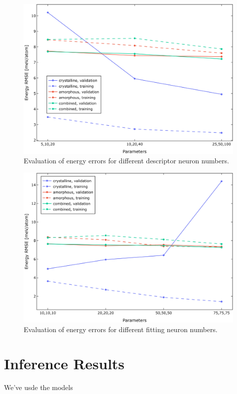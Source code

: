 \begin{figure}
  \begin{center}
    \includegraphics[width=.8\textwidth]{
      asset/descriptor_energy_error_evaluation.jpg
    }
  \end{center}
  \caption{Evaluation of energy errors for different descriptor neuron numbers.}
  \label{fig:descriptor_energy_error_evaluation}
\end{figure}

\begin{figure}
  \begin{center}
    \includegraphics[width=.8\textwidth]{
      asset/fitting_energy_error_evaluation.jpg
    }
  \end{center}
  \caption{Evaluation of energy errors for different fitting neuron numbers.}
  \label{fig:fitting_energy_error_evaluation}
\end{figure}

\section{Inference Results}

We've usde the models 